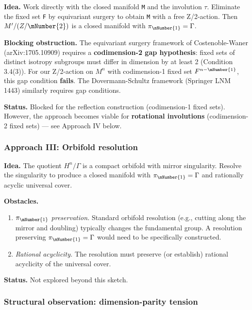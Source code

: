 \textbf{Idea.} Work directly with the closed manifold \texttt{M} and the involution
\(\tau\). Eliminate the fixed set \texttt{F} by equivariant surgery to obtain \texttt{M\textquotesingle{}}
with a free Z/2-action. Then \(M'/(Z/\mNumber{2})\) is a closed manifold with
\(\pi_\mNumber{1} = \Gamma\).

\textbf{Blocking obstruction.} The equivariant surgery framework of
Costenoble-Waner (arXiv:1705.10909) requires a \textbf{codimension-2 gap
hypothesis}: fixed sets of distinct isotropy subgroups must differ in
dimension by at least 2 (Condition 3.4(3)). For our Z/2-action on \(M^{n}\)
with codimension-1 fixed set \(F^{n-\mNumber{1}}\), this gap condition \textbf{fails}.
The Dovermann-Schultz framework (Springer LNM 1443) similarly requires
gap conditions.

\textbf{Status.} Blocked for the reflection construction (codimension-1 fixed
sets). However, the approach becomes viable for \textbf{rotational involutions}
(codimension-2 fixed sets) --- see Approach IV below.

\hypertarget{approach-iii-orbifold-resolution}{%
\subsubsection{Approach III: Orbifold resolution}\label{approach-iii-orbifold-resolution}}

\textbf{Idea.} The quotient \(H^{n}/\Gamma\) is a compact orbifold with mirror
singularity. Resolve the singularity to produce a closed manifold with
\(\pi_\mNumber{1} = \Gamma\) and rationally acyclic universal cover.

\textbf{Obstacles.}

\begin{enumerate}
\def\labelenumi{\arabic{enumi}.}
\item
  \emph{\(\pi_\mNumber{1}\) preservation.} Standard orbifold resolution (e.g., cutting along
  the mirror and doubling) typically changes the fundamental group.
  A resolution preserving \(\pi_\mNumber{1} = \Gamma\) would need to be specifically
  constructed.
\item
  \emph{Rational acyclicity.} The resolution must preserve (or establish)
  rational acyclicity of the universal cover.
\end{enumerate}

\textbf{Status.} Not explored beyond this sketch.

\hypertarget{structural-observation-dimension-parity-tension}{%
\subsubsection{Structural observation: dimension-parity tension}\label{structural-observation-dimension-parity-tension}}

